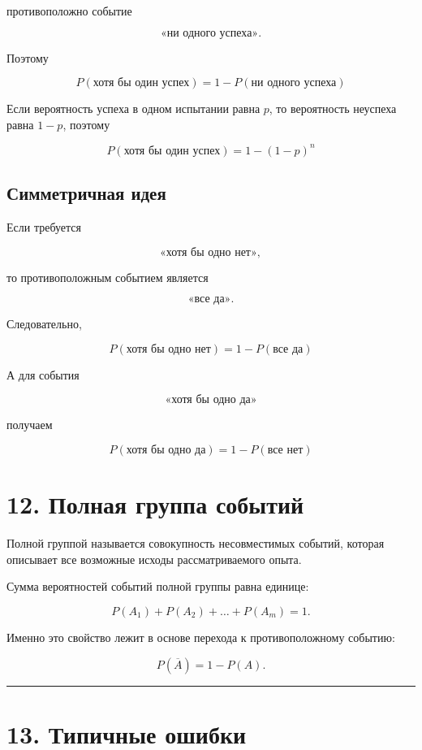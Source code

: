 \documentclass[a4paper,12pt]{article}
\newcommand{\accentline}{%
    \par\noindent
    {\color{accent}\rule{\linewidth}{0.7pt}}
    \par
}
\begin{document}
противоположно событие

\[
\text{«ни одного успеха»}.
\]

Поэтому

\[
\boxed{
P(\text{хотя бы один успех})
=
1-P(\text{ни одного успеха})
}
\]

Если вероятность успеха в одном испытании равна $p$, то вероятность неуспеха равна $1-p$, поэтому

\[
\boxed{
P(\text{хотя бы один успех})
=
1-(1-p)^n
}
\]

\subsection*{Симметричная идея}

Если требуется

\[
\text{«хотя бы одно нет»},
\]

то противоположным событием является

\[
\text{«все да»}.
\]

Следовательно,

\[
\boxed{
P(\text{хотя бы одно нет})
=
1-P(\text{все да})
}
\]

А для события

\[
\text{«хотя бы одно да»}
\]

получаем

\[
\boxed{
P(\text{хотя бы одно да})
=
1-P(\text{все нет})
}
\]

\section*{\color{darkaccent}12. Полная группа событий}

Полной группой называется совокупность несовместимых событий, которая описывает все возможные исходы рассматриваемого опыта.

Сумма вероятностей событий полной группы равна единице:

\[
P(A_1)+P(A_2)+\ldots+P(A_m)=1.
\]

Именно это свойство лежит в основе перехода к противоположному событию:

\[
P(\overline A)=1-P(A).
\]

\accentline

\section*{\color{darkaccent}13. Типичные ошибки}
\end{document}
